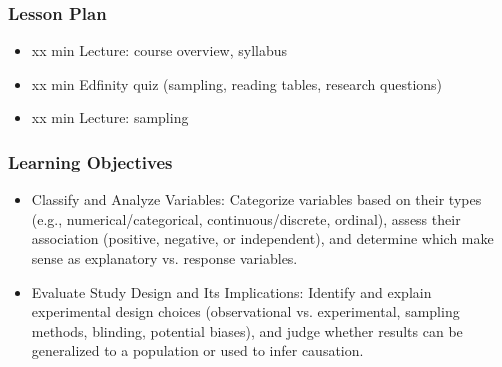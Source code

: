 \begin{frame}
    \frametitle{Lesson Plan}
    \begin{itemize}
        \item xx min Lecture: course overview, syllabus
        \item xx min Edfinity quiz (sampling, reading tables, research questions)
        \item xx min Lecture: sampling
    \end{itemize}
    \end{frame}
    
    \begin{frame}
    \frametitle{Learning Objectives}
    \begin{itemize}
        \item Classify and Analyze Variables: Categorize variables based on their types (e.g., numerical/categorical, continuous/discrete, ordinal), assess their association (positive, negative, or independent), and determine which make sense as explanatory vs. response variables.
        \item Evaluate Study Design and Its Implications: Identify and explain experimental design choices (observational vs. experimental, sampling methods, blinding, potential biases), and judge whether results can be generalized to a population or used to infer causation. 
    \end{itemize}
    \end{frame}